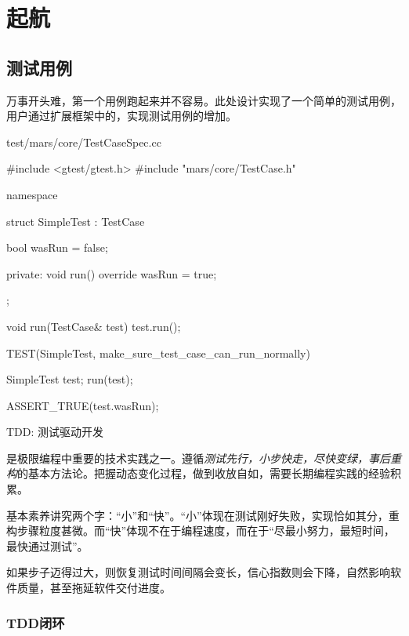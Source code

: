 \section{起航}

\begin{content}

\subsection{测试用例}

万事开头难，第一个用例跑起来并不容易。此处设计实现了一个简单的测试用例，用户通过扩展框架中的，实现测试用例的增加。

\begin{nodiff}{test/mars/core/TestCaseSpec.cc}
 \begin{c++}
#include <gtest/gtest.h>
#include "mars/core/TestCase.h"

namespace {
  struct SimpleTest : TestCase {
    bool wasRun = false;

  private:
    void run() override {
      wasRun = true;
    }
  };

  void run(TestCase& test) {
    test.run();
  }
}

TEST(SimpleTest, make_sure_test_case_can_run_normally) {
  SimpleTest test;
  run(test);

  ASSERT_TRUE(test.wasRun);
}
 \end{c++}
\end{nodiff}

\begin{episode}{TDD: 测试驱动开发}

\begin{content}

是极限编程中重要的技术实践之一。遵循\emph{测试先行，小步快走，尽快变绿，事后重构}的基本方法论。把握动态变化过程，做到收放自如，需要长期编程实践的经验积累。

基本素养讲究两个字：“小”和“快”。“小”体现在测试刚好失败，实现恰如其分，重构步骤粒度甚微。而“快”体现不在于编程速度，而在于“尽最小努力，最短时间，最快通过测试”。

如果步子迈得过大，则恢复测试时间间隔会变长，信心指数则会下降，自然影响软件质量，甚至拖延软件交付进度。

\subsubsection{TDD闭环}


\end{content}
\end{episode}
\end{content}
